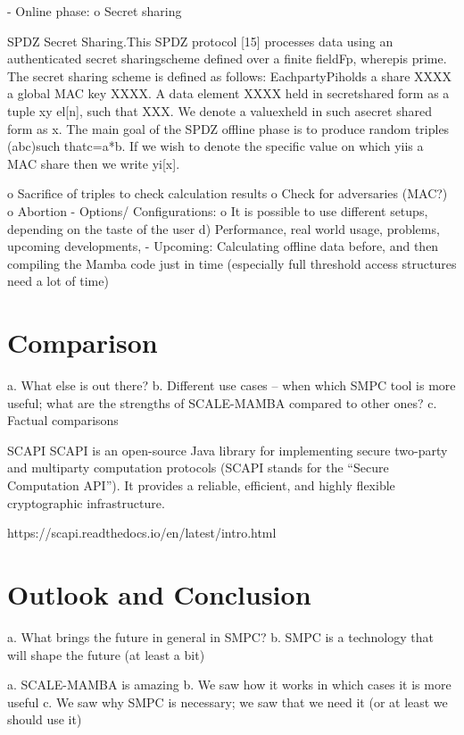 \documentclass[english,runningheads,a4paper]{llncs}[2018/03/10]
\begin{document}
-	Online phase:
o	Secret sharing

SPDZ  Secret  Sharing.This  SPDZ  protocol  [15]  processes  data  using  an  authenticated  secret  sharingscheme defined over a finite fieldFp, wherepis prime. The secret sharing scheme is defined as follows: EachpartyPiholds a share XXXX a global MAC key XXXX. A data element XXXX held in secretshared form as a tuple  xy el[n], such that XXX. We denote a valuexheld in such asecret shared form as x. The main goal of the SPDZ offline phase is to produce random triples (abc)such thatc=a*b. If we wish to denote the specific value on which yiis a MAC share then we write yi[x].

o	Sacrifice of triples to check calculation results
o	Check for adversaries (MAC?)
o	Abortion
-	Options/ Configurations:
o	It is possible to use different setups, depending on the taste of the user
d)	Performance, real world usage, problems, upcoming developments, 
-	Upcoming: Calculating offline data before, and then compiling the Mamba code just in time (especially full threshold access structures need a lot of time)




\section{Comparison}\label{sec:comparison}


a.	What else is out there?
b.	Different use cases – when which SMPC tool is more useful; what are the strengths of SCALE-MAMBA compared to other ones?
c.	Factual comparisons

SCAPI
SCAPI is an open-source Java library for implementing secure two-party and multiparty computation protocols (SCAPI stands for the “Secure Computation API”). It provides a reliable, efficient, and highly flexible cryptographic infrastructure.

https://scapi.readthedocs.io/en/latest/intro.html


\section{Outlook and Conclusion}\label{sec:outlook}

a.	What brings the future in general in SMPC?
b.	SMPC is a technology that will shape the future (at least a bit)


a.	SCALE-MAMBA is amazing
b.	We saw how it works in which cases it is more useful
c.	We saw why SMPC is necessary; we saw that we need it (or at least we should use it)
\end{document}
